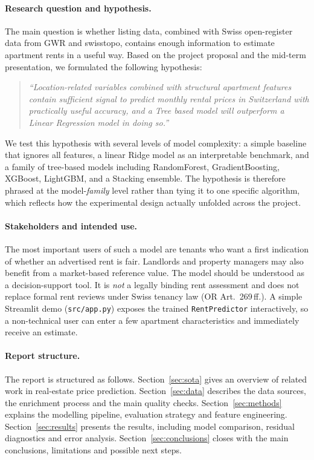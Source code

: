 \documentclass[11pt,a4paper]{article}
\begin{document}
\paragraph{Research question and hypothesis.}
The main question is whether listing data, combined with Swiss open-register data from GWR and swisstopo, contains enough information to estimate apartment rents in a useful way. Based on the project proposal and the mid-term presentation, we formulated the following hypothesis:

\begin{quote}\itshape
``Location-related variables combined with structural apartment features contain sufficient signal to predict monthly rental prices in Switzerland with practically useful accuracy, and a Tree based model will outperform a Linear Regression model in doing so.''
\end{quote}

We test this hypothesis with several levels of model complexity: a simple baseline that ignores all features, a linear Ridge model as an interpretable benchmark, and a family of tree-based models including RandomForest, GradientBoosting, XGBoost, LightGBM, and a Stacking ensemble. The hypothesis is therefore phrased at the model-\emph{family} level rather than tying it to one specific algorithm, which reflects how the experimental design actually unfolded across the project.

\paragraph{Stakeholders and intended use.}
The most important users of such a model are tenants who want a first indication of whether an advertised rent is fair. Landlords and property managers may also benefit from a market-based reference value. The model should be understood as a decision-support tool. It is \emph{not} a legally binding rent assessment and does not replace formal rent reviews under Swiss tenancy law (OR Art.~269\,ff.). A simple Streamlit demo (\texttt{src/app.py}) exposes the trained \texttt{RentPredictor} interactively, so a non-technical user can enter a few apartment characteristics and immediately receive an estimate.

\paragraph{Report structure.}
The report is structured as follows. Section~\ref{sec:sota} gives an overview of related work in real-estate price prediction. Section~\ref{sec:data} describes the data sources, the enrichment process and the main quality checks. Section~\ref{sec:methods} explains the modelling pipeline, evaluation strategy and feature engineering. Section~\ref{sec:results} presents the results, including model comparison, residual diagnostics and error analysis. Section~\ref{sec:conclusions} closes with the main conclusions, limitations and possible next steps.
\end{document}
